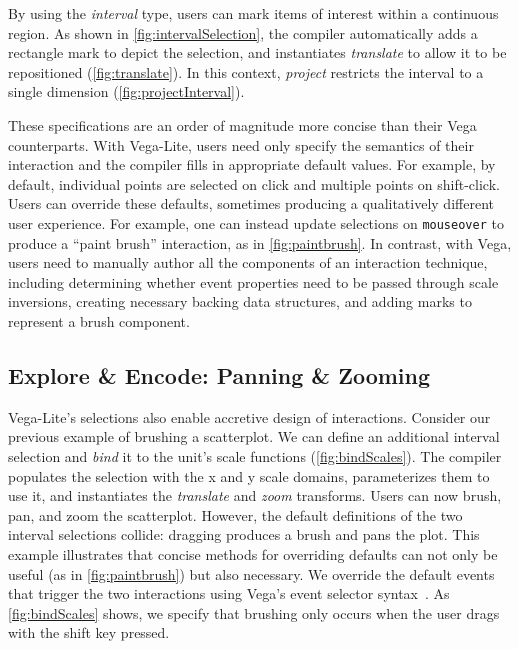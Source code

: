 By using the \emph{interval} type, users can mark items of interest within a
continuous region. As shown in \cref{fig:intervalSelection}, the compiler
automatically adds a rectangle mark to depict the selection, and instantiates
\emph{translate} to allow it to be repositioned (\cref{fig:translate}). In this
context, \emph{project} restricts the interval to a single dimension
(\cref{fig:projectInterval}).

These specifications are an order of magnitude more concise than their Vega
counterparts. With Vega-Lite, users need only specify the semantics of their
interaction and the compiler fills in appropriate default values. For example,
by default, individual points are selected on click and multiple points on
shift-click. Users can override these defaults, sometimes producing a
qualitatively different user experience. For example, one can instead update
selections on \texttt{mouseover} to produce a ``paint brush'' interaction, as in
\cref{fig:paintbrush}. In contrast, with Vega, users need to manually author all
the components of an interaction technique, including determining whether event
properties need to be passed through scale inversions, creating necessary
backing data structures, and adding marks to represent a brush component.

\subsection{Explore \& Encode: Panning \& Zooming}

Vega-Lite's selections also enable accretive design of interactions. Consider
our previous example of brushing a scatterplot. We can define an additional
interval selection and \emph{bind} it to the unit's scale functions
(\cref{fig:bindScales}). The compiler populates the selection with the x and y
scale domains, parameterizes them to use it, and instantiates the
\emph{translate} and \emph{zoom} transforms. Users can now brush, pan, and zoom
the scatterplot. However, the default definitions of the two interval selections
collide: dragging produces a brush and pans the plot. This example illustrates
that concise methods for overriding defaults can not only be useful (as in
\cref{fig:paintbrush}) but also necessary. We override the default events that
trigger the two interactions using Vega's event selector
syntax~\cite{reactive-vega-model}. As \cref{fig:bindScales} shows, we specify
that brushing only occurs when the user drags with the shift key pressed.


